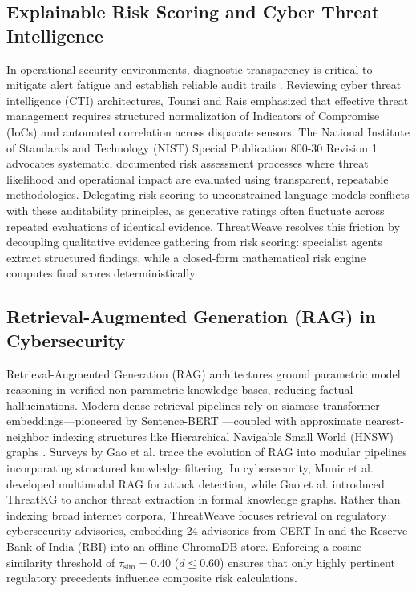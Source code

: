 \documentclass[conference]{IEEEtran}
\begin{document}
\subsection{Explainable Risk Scoring and Cyber Threat Intelligence}
In operational security environments, diagnostic transparency is critical to mitigate alert fatigue and establish reliable audit trails \cite{capuano2022xai}. Reviewing cyber threat intelligence (CTI) architectures, Tounsi and Rais \cite{tounsi2018threatintel} emphasized that effective threat management requires structured normalization of Indicators of Compromise (IoCs) and automated correlation across disparate sensors. The National Institute of Standards and Technology (NIST) Special Publication 800-30 Revision 1 \cite{nist80030r1} advocates systematic, documented risk assessment processes where threat likelihood and operational impact are evaluated using transparent, repeatable methodologies. Delegating risk scoring to unconstrained language models conflicts with these auditability principles, as generative ratings often fluctuate across repeated evaluations of identical evidence. ThreatWeave resolves this friction by decoupling qualitative evidence gathering from risk scoring: specialist agents extract structured findings, while a closed-form mathematical risk engine computes final scores deterministically.

\subsection{Retrieval-Augmented Generation (RAG) in Cybersecurity}
Retrieval-Augmented Generation (RAG) architectures \cite{lewis2020rag} ground parametric model reasoning in verified non-parametric knowledge bases, reducing factual hallucinations. Modern dense retrieval pipelines rely on siamese transformer embeddings—pioneered by Sentence-BERT \cite{reimers2019sbert}—coupled with approximate nearest-neighbor indexing structures like Hierarchical Navigable Small World (HNSW) graphs \cite{malkov2020hnsw}. Surveys by Gao et al. \cite{gao2023ragsurvey} trace the evolution of RAG into modular pipelines incorporating structured knowledge filtering. In cybersecurity, Munir et al. \cite{munir2024transitrag} developed multimodal RAG for attack detection, while Gao et al. \cite{gao2023threatkg} introduced ThreatKG to anchor threat extraction in formal knowledge graphs. Rather than indexing broad internet corpora, ThreatWeave focuses retrieval on regulatory cybersecurity advisories, embedding 24 advisories from CERT-In and the Reserve Bank of India (RBI) \cite{rbi2021security, certin2024annual} into an offline ChromaDB store. Enforcing a cosine similarity threshold of $\tau_{\text{sim}} = 0.40$ ($d \le 0.60$) ensures that only highly pertinent regulatory precedents influence composite risk calculations.
\end{document}
